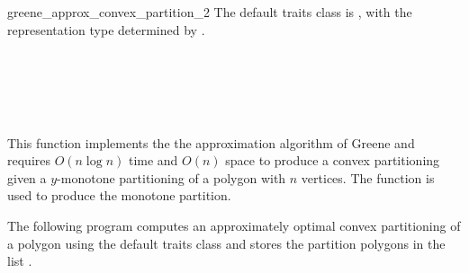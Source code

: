 \begin{ccRefFunction}{greene_approx_convex_partition_2}
The default traits class  is ,
with the representation type determined by .

\ccSeeAlso
{} \\
 \\
 \\
 \\

\ccImplementation
This function implements the the approximation algorithm of 
Greene \cite{g-dpcp-83} and requires $O(n \log n)$ time and $O(n)$ space
to produce a convex partitioning given a $y$-monotone partitioning of a
polygon with $n$ vertices.  The function  
is used to produce the monotone partition.

\ccExample
The following program computes an approximately optimal
convex partitioning of a polygon using the default
traits class and stores the partition polygons in the list 
.



\end{ccRefFunction}
